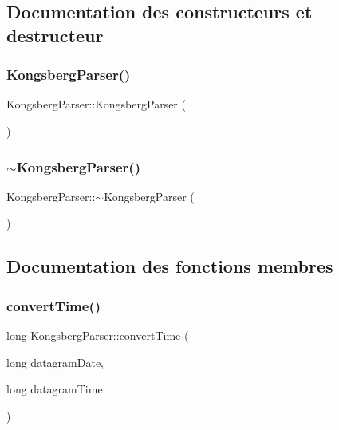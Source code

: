\subsection{Documentation des constructeurs et destructeur}
\mbox{\label{classKongsbergParser_a9a756a45d8d6ba1f83567685daf23f91}} 
\subsubsection{\texorpdfstring{Kongsberg\+Parser()}{KongsbergParser()}}
{\footnotesize\ttfamily Kongsberg\+Parser\+::\+Kongsberg\+Parser (\begin{DoxyParamCaption}{ }\end{DoxyParamCaption})}

\mbox{\label{classKongsbergParser_a7500ac454b264049e6f2078d914e86da}} 
\subsubsection{\texorpdfstring{$\sim$\+Kongsberg\+Parser()}{~KongsbergParser()}}
{\footnotesize\ttfamily Kongsberg\+Parser\+::$\sim$\+Kongsberg\+Parser (\begin{DoxyParamCaption}{ }\end{DoxyParamCaption})}



\subsection{Documentation des fonctions membres}
\mbox{\label{classKongsbergParser_a916ac4169f44591ae5d768545f6081fc}} 
\subsubsection{\texorpdfstring{convert\+Time()}{convertTime()}}
{\footnotesize\ttfamily long Kongsberg\+Parser\+::convert\+Time (\begin{DoxyParamCaption}\item[{long}]{datagram\+Date,  }\item[{long}]{datagram\+Time }\end{DoxyParamCaption})\hspace{0.3cm}{\ttfamily [private]}}

